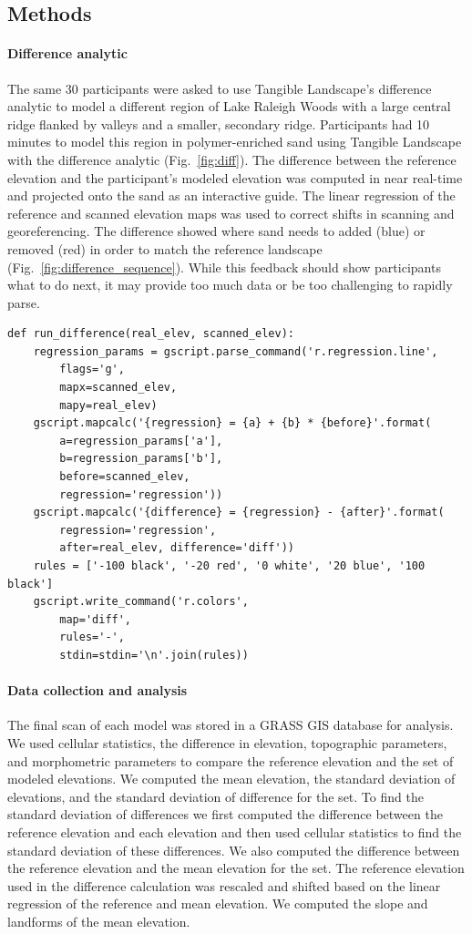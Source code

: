 \documentclass[prodmode,acmtochi]{acmsmall} %
\begin{document}
\subsection{Methods}
%
\paragraph{Difference analytic}
The same 30 participants were asked to use 
Tangible Landscape's difference analytic to model 
a different region of Lake Raleigh Woods
with a large central ridge 
flanked by valleys 
and a smaller, secondary ridge.
Participants had 10 minutes to model this region
in polymer-enriched sand using Tangible Landscape 
with the difference analytic (Fig.~\ref{fig:diff}). 
The difference between the reference elevation 
and the participant's modeled elevation %
was computed in near real-time and projected onto the sand 
as an interactive guide.
The linear regression of the reference and scanned elevation maps was used
to correct shifts in scanning and georeferencing. 
The difference showed where sand needs to added (blue) or removed (red) 
in order to match the reference landscape (Fig.~\ref{fig:difference_sequence}). 
While this feedback should show participants what to do next, 
it may provide too much data or be too challenging to rapidly parse. 

\begin{verbatim}
def run_difference(real_elev, scanned_elev):
	regression_params = gscript.parse_command('r.regression.line', 
		flags='g',
		mapx=scanned_elev,
		mapy=real_elev)
	gscript.mapcalc('{regression} = {a} + {b} * {before}'.format(
		a=regression_params['a'],
		b=regression_params['b'],
		before=scanned_elev,
		regression='regression'))
	gscript.mapcalc('{difference} = {regression} - {after}'.format(
		regression='regression',
		after=real_elev, difference='diff'))
	rules = ['-100 black', '-20 red', '0 white', '20 blue', '100 black']
	gscript.write_command('r.colors', 
		map='diff',
		rules='-',
		stdin=stdin='\n'.join(rules))
\end{verbatim}

\paragraph{Data collection and analysis}
The final scan of each model was stored in a GRASS GIS database for analysis. 
We used cellular statistics, the difference in elevation, 
topographic parameters, and morphometric parameters
to compare the reference elevation and the set of modeled elevations. 
We computed 
the mean elevation,
the standard deviation of elevations, 
and the standard deviation of difference for the set.
To find the standard deviation of differences 
we first computed the difference between the reference elevation and each elevation 
and then used cellular statistics to find the standard deviation of these differences.
We also computed the difference between the 
reference elevation and the mean elevation for the set. 
The reference elevation used in the difference calculation was rescaled and shifted based on the linear regression of the reference and mean elevation.
We computed the slope and landforms of the mean elevation. 
\end{document}
